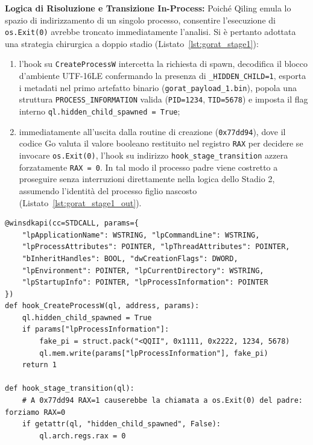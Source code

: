 \documentclass[11pt, a4paper]{article}
\begin{document}
\textbf{Logica di Risoluzione e Transizione In-Process:} Poich\'e Qiling emula lo spazio di indirizzamento di un singolo processo, consentire l'esecuzione di \texttt{os.Exit(0)} avrebbe troncato immediatamente l'analisi. Si \`e pertanto adottata una strategia chirurgica a doppio stadio (Listato~\ref{lst:gorat_stage1}):
\begin{enumerate}
	\item l'hook su \texttt{Create\allowbreak{}ProcessW} intercetta la richiesta di spawn, decodifica il blocco d'ambiente UTF-16LE confermando la presenza di \texttt{\_\allowbreak{}HIDDEN\_\allowbreak{}CHILD=1}, esporta i metadati nel primo artefatto binario (\texttt{gorat\_\allowbreak{}payload\_\allowbreak{}1.\allowbreak{}bin}), popola una struttura \texttt{PROCESS\_\allowbreak{}INFORMATION} valida (\texttt{PID=1234}, \texttt{TID=5678}) e imposta il flag interno \texttt{ql.\allowbreak{}hidden\_\allowbreak{}child\_\allowbreak{}spawned = True};
	\item immediatamente all'uscita dalla routine di creazione (\texttt{0x77dd94}), dove il codice Go valuta il valore booleano restituito nel registro \texttt{RAX} per decidere se invocare \texttt{os.Exit(0)}, l'hook su indirizzo \texttt{hook\_\allowbreak{}stage\_\allowbreak{}transition} azzera forzatamente \texttt{RAX = 0}. In tal modo il processo padre viene costretto a proseguire senza interruzioni direttamente nella logica dello Stadio 2, assumendo l'identit\`a del processo figlio nascosto (Listato~\ref{lst:gorat_stage1_out}).
\end{enumerate}

\begin{lstlisting}[style=pythoncode, caption={Intercettazione dello spawn nascosto su CreateProcessW e transizione diretta in-process a 0x77dd94.}, label={lst:gorat_stage1}]
@winsdkapi(cc=STDCALL, params={
    "lpApplicationName": WSTRING, "lpCommandLine": WSTRING,
    "lpProcessAttributes": POINTER, "lpThreadAttributes": POINTER,
    "bInheritHandles": BOOL, "dwCreationFlags": DWORD,
    "lpEnvironment": POINTER, "lpCurrentDirectory": WSTRING,
    "lpStartupInfo": POINTER, "lpProcessInformation": POINTER
})
def hook_CreateProcessW(ql, address, params):
    ql.hidden_child_spawned = True
    if params["lpProcessInformation"]:
        fake_pi = struct.pack("<QQII", 0x1111, 0x2222, 1234, 5678)
        ql.mem.write(params["lpProcessInformation"], fake_pi)
    return 1

def hook_stage_transition(ql):
    # A 0x77dd94 RAX=1 causerebbe la chiamata a os.Exit(0) del padre: forziamo RAX=0
    if getattr(ql, "hidden_child_spawned", False):
        ql.arch.regs.rax = 0
\end{lstlisting}
\end{document}
